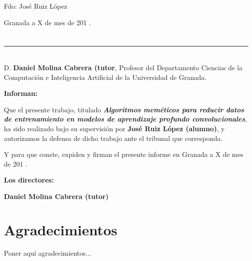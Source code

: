 \vspace{6cm}

\noindent Fdo: José Ruiz López

\vspace{2cm}

\begin{flushright}
Granada a X de mes de 201 .
\end{flushright}


\chapter*{}
\thispagestyle{empty}

\noindent\rule[-1ex]{\textwidth}{2pt}\\[4.5ex]

D. \textbf{Daniel Molina Cabrera (tutor}, Profesor del Departamento Ciencias de la Computación e Inteligencia
Artificial de la Universidad de Granada.

\vspace{0.5cm}

\textbf{Informan:}

\vspace{0.5cm}

Que el presente trabajo, titulado \textit{\textbf{Algoritmos meméticos para reducir datos de entrenamiento en modelos
de aprendizaje profundo convolucionales}},
ha sido realizado bajo su supervisión por \textbf{José Ruiz López (alumno)}, y autorizamos la defensa de dicho trabajo
ante el tribunal que corresponda.

\vspace{0.5cm}

Y para que conste, expiden y firman el presente informe en Granada a X de mes de 201 .

\vspace{1cm}

\textbf{Los directores:}

\vspace{5cm}

\noindent \textbf{Daniel Molina Cabrera (tutor)}

\chapter*{Agradecimientos}
\thispagestyle{empty}

       \vspace{1cm}


Poner aquí agradecimientos...

